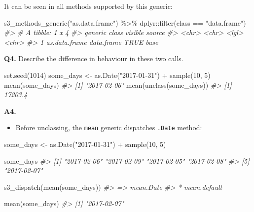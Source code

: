 \documentclass[
]{book}
\newenvironment{Shaded}{\begin{snugshade}}{\end{snugshade}}
\newcommand{\CommentTok}[1]{\textcolor[rgb]{0.56,0.35,0.01}{\textit{#1}}}
\newcommand{\DecValTok}[1]{\textcolor[rgb]{0.00,0.00,0.81}{#1}}
\newcommand{\FunctionTok}[1]{\textcolor[rgb]{0.00,0.00,0.00}{#1}}
\newcommand{\NormalTok}[1]{#1}
\newcommand{\OtherTok}[1]{\textcolor[rgb]{0.56,0.35,0.01}{#1}}
\newcommand{\SpecialCharTok}[1]{\textcolor[rgb]{0.00,0.00,0.00}{#1}}
\newcommand{\StringTok}[1]{\textcolor[rgb]{0.31,0.60,0.02}{#1}}
\providecommand{\tightlist}{%
  \setlength{\itemsep}{0pt}\setlength{\parskip}{0pt}}
\begin{document}
It can be seen in all methods supported by this generic:

\begin{Shaded}
\begin{Highlighting}[]
\FunctionTok{s3\_methods\_generic}\NormalTok{(}\StringTok{"as.data.frame"}\NormalTok{) }\SpecialCharTok{\%\textgreater{}\%}
\NormalTok{  dplyr}\SpecialCharTok{::}\FunctionTok{filter}\NormalTok{(class }\SpecialCharTok{==} \StringTok{"data.frame"}\NormalTok{)}
\CommentTok{\#\textgreater{} \# A tibble: 1 x 4}
\CommentTok{\#\textgreater{}   generic       class      visible source}
\CommentTok{\#\textgreater{}   \textless{}chr\textgreater{}         \textless{}chr\textgreater{}      \textless{}lgl\textgreater{}   \textless{}chr\textgreater{} }
\CommentTok{\#\textgreater{} 1 as.data.frame data.frame TRUE    base}
\end{Highlighting}
\end{Shaded}

\textbf{Q4.} Describe the difference in behaviour in these two calls.

\begin{Shaded}
\begin{Highlighting}[]
\FunctionTok{set.seed}\NormalTok{(}\DecValTok{1014}\NormalTok{)}
\NormalTok{some\_days }\OtherTok{\textless{}{-}} \FunctionTok{as.Date}\NormalTok{(}\StringTok{"2017{-}01{-}31"}\NormalTok{) }\SpecialCharTok{+} \FunctionTok{sample}\NormalTok{(}\DecValTok{10}\NormalTok{, }\DecValTok{5}\NormalTok{)}
\FunctionTok{mean}\NormalTok{(some\_days)}
\CommentTok{\#\textgreater{} [1] "2017{-}02{-}06"}
\FunctionTok{mean}\NormalTok{(}\FunctionTok{unclass}\NormalTok{(some\_days))}
\CommentTok{\#\textgreater{} [1] 17203.4}
\end{Highlighting}
\end{Shaded}

\textbf{A4.}

\begin{itemize}
\tightlist
\item
  Before unclassing, the \texttt{mean} generic dispatches \texttt{.Date} method:
\end{itemize}

\begin{Shaded}
\begin{Highlighting}[]
\NormalTok{some\_days }\OtherTok{\textless{}{-}} \FunctionTok{as.Date}\NormalTok{(}\StringTok{"2017{-}01{-}31"}\NormalTok{) }\SpecialCharTok{+} \FunctionTok{sample}\NormalTok{(}\DecValTok{10}\NormalTok{, }\DecValTok{5}\NormalTok{)}

\NormalTok{some\_days}
\CommentTok{\#\textgreater{} [1] "2017{-}02{-}06" "2017{-}02{-}09" "2017{-}02{-}05" "2017{-}02{-}08"}
\CommentTok{\#\textgreater{} [5] "2017{-}02{-}07"}

\FunctionTok{s3\_dispatch}\NormalTok{(}\FunctionTok{mean}\NormalTok{(some\_days))}
\CommentTok{\#\textgreater{} =\textgreater{} mean.Date}
\CommentTok{\#\textgreater{}  * mean.default}

\FunctionTok{mean}\NormalTok{(some\_days)}
\CommentTok{\#\textgreater{} [1] "2017{-}02{-}07"}
\end{Highlighting}
\end{Shaded}
\end{document}
